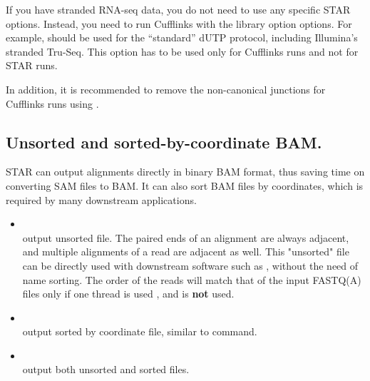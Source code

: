 \documentclass[12pt]{article}
\begin{document}
If you have stranded RNA-seq data, you do not need to use any specific STAR options. Instead, you need to run Cufflinks with the library option  options. For example,  should be used for the “standard” dUTP protocol, including Illumina's stranded Tru-Seq. This option has to be used only for Cufflinks runs and not for STAR runs.

In addition, it is recommended to remove the non-canonical junctions for Cufflinks runs using  .

\subsection{Unsorted and sorted-by-coordinate BAM.}
STAR can output alignments directly in binary BAM format, thus saving time on converting SAM files to BAM. It can also sort BAM files by coordinates, which is required by many downstream applications.
\begin{itemize}
\raggedright
\item[]
 \\
output unsorted  file. The paired ends of an alignment are always adjacent, and multiple alignments of a read are adjacent as well. This "unsorted" file can be directly used with downstream software such as , without the need of name sorting. The order of the reads will match that of the input FASTQ(A) files only if one thread is used  , and   is \textbf{not} used.
\item[]
 \\
output sorted by coordinate  file, similar to  command.
\item[]
 \\
output both unsorted and sorted files.
\end{itemize}
\end{document}
